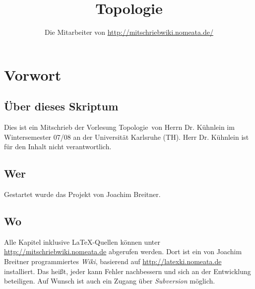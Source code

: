 \documentclass[a4paper,twoside,DIV15,BCOR12mm]{scrbook}
\author{Die Mitarbeiter von \url{http://mitschriebwiki.nomeata.de/}}
\title{Topologie}
\begin{document}
\maketitle
 
\tableofcontents


\chapter{Vorwort}

\section*{Über dieses Skriptum}
Dies ist ein Mitschrieb der Vorlesung \glqq Topologie\grqq\ von Herrn Dr. Kühnlein im
Wintersemester 07/08 an der Universität Karlsruhe (TH).
Herr Dr. Kühnlein ist für  den
Inhalt nicht verantwortlich.

\section*{Wer}
Gestartet wurde das Projekt von Joachim Breitner.


\section*{Wo}
Alle Kapitel inklusive \LaTeX-Quellen können unter \url{http://mitschriebwiki.nomeata.de} abgerufen werden.
Dort ist ein von Joachim Breitner programmiertes \emph{Wiki}, basierend auf \url{http://latexki.nomeata.de} installiert. 
Das heißt, jeder kann Fehler nachbessern und sich an der Entwicklung
beteiligen. Auf Wunsch ist auch ein Zugang über \emph{Subversion} möglich.

\setcounter{chapter}{0}
\renewcommand{\thechapter}{\Roman{chapter}}

\end{document}
